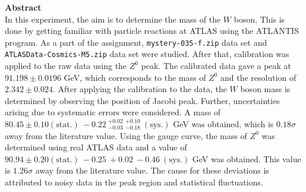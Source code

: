 \documentclass[a4paper]{report}
\numberwithin{equation}{section}
\begin{document}
\begin{titlepage}
	\vspace*{5em}

	\begin{minipage}{0.8\textwidth}
		\begin{centering}
			\textbf{Abstract}\\[0.2cm]
            In this experiment, the aim is to determine the mass of the $W$ boson. This is done by getting familiar with particle reactions at ATLAS using the ATLANTIS program. As a part of the assignment, \texttt{mystery-035-f.zip} data set and \texttt{ATLASData-Cosmics-M5.zip} data set were studied. After that, calibration was applied to the raw data using the $Z^0$ peak. The calibrated data gave a peak at $91.198 \pm 0.0196$ GeV, which corresponds to the mass of $Z^0$ and the resolution of $2.342 \pm 0.024$. After applying the calibration to the data, the $W$ boson mass is determined by observing the position of Jacobi peak. Further, uncertainties arising due to systematic errors were considered. A mass of $80.45 \pm 0.10 (\mathrm{stat.}) \: -0.22 \: ^{+0.02}_{-0.03} \: ^{+0.10}_{-0.18} \: (\mathrm{sys.})$ GeV was obtained, which is $0.18\sigma$ away from the literature value. Using the gauge curve, the mass of $Z^0$ was determined using real ATLAS data and a value of $90.94 \pm 0.20 (\mathrm{stat.}) \: -0.25 \: + 0.02 \: -0.46 \: (\mathrm{sys.})$ GeV was obtained. This value is $1.26\sigma$ away from the literature value. The cause for these deviations is attributed to noisy data in the peak region and statistical fluctuations. 
		\end{centering}
	\end{minipage}
	
	
	
	
	
	
	 
	
	
\end{titlepage}
\end{document}

